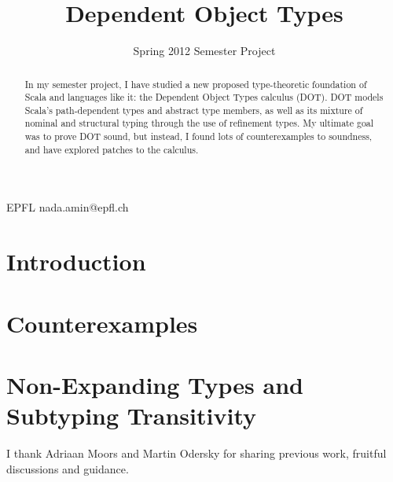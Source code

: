 \documentclass[preprint]{sigplanconf}
\begin{document}
\copyrightdata{[to be supplied]}


\title{Dependent Object Types}
\subtitle{Spring 2012 Semester Project}

           {EPFL}
           {nada.amin@epfl.ch}

\maketitle

\begin{abstract}
In my semester project, I have studied a new proposed type-theoretic
foundation of Scala and languages like it: the Dependent Object Types
calculus (DOT). DOT models Scala's path-dependent types and abstract
type members, as well as its mixture of nominal and structural typing
through the use of refinement types. My ultimate goal was to prove DOT
sound, but instead, I found lots of counterexamples to soundness, and
have explored patches to the calculus.
\end{abstract}


\section{Introduction}


\section{Counterexamples}

\section{Non-Expanding Types and Subtyping Transitivity}



\acks

I thank Adriaan Moors and Martin Odersky for sharing previous work,
fruitful discussions and guidance.

%
%
\end{document}
